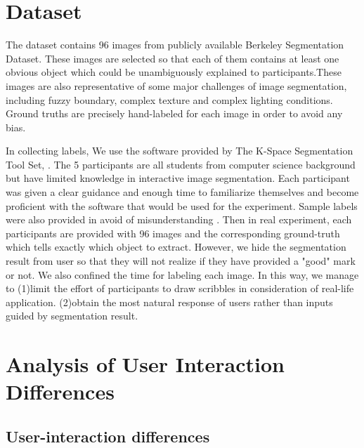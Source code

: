 \documentclass[runningheads,a4paper]{llncs}
\begin{document}
\section{Dataset}
The dataset contains 96 images from publicly available Berkeley Segmentation Dataset\citep{martin2001database}. These images are selected so that each of them contains at least one obvious object which could be unambiguously explained to participants.These images are also representative of some major challenges of image segmentation, including fuzzy boundary, complex texture and complex lighting conditions. Ground truths are precisely hand-labeled for each image in order to avoid any bias.

In collecting labels, We use the software provided by The K-Space Segmentation Tool Set, \citep{mcguinness2008k}. The 5 participants are all students from computer science background but have limited knowledge in interactive image segmentation. Each participant was given a clear guidance and enough time to familiarize themselves and become proficient with the software that would be used for the experiment. Sample labels were also provided in avoid of misunderstanding . Then in real experiment, each participants are provided with 96 images and the corresponding ground-truth which tells exactly which object to extract. However, we hide the segmentation result from user so that they will not realize if they have provided a "good" mark or not. We also confined the time for labeling each image. In this way, we manage to (1)limit the effort of participants to draw scribbles in consideration of real-life application.
(2)obtain the most natural response of users rather than inputs guided by segmentation result.

\section{Analysis of User Interaction Differences}

\subsection{User-interaction differences}
\end{document}
